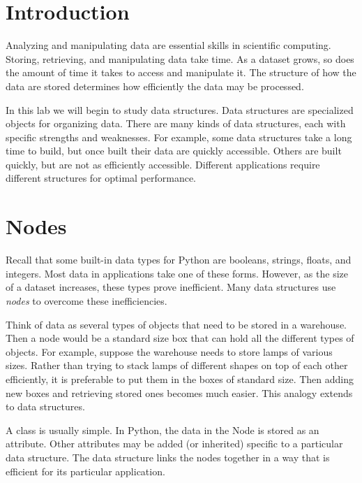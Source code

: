 \label{lab:Python_DataStructures}


\section*{Introduction}

Analyzing and manipulating data are essential skills in scientific computing.
Storing, retrieving, and manipulating data take time.
As a dataset grows, so does the amount of time it takes to access and manipulate it.
The structure of how the data are stored determines how efficiently the data may be processed.

In this lab we will begin to study data structures.
Data structures are specialized objects for organizing data.
There are many kinds of data structures, each with specific strengths and weaknesses.
For example, some data structures take a long time to build, but once built their data are quickly accessible.
Others are built quickly, but are not as efficiently accessible.
Different applications require different structures for optimal performance.

\section*{Nodes}

Recall that some built-in data types for Python are booleans, strings, floats, and integers.
Most data in applications take one of these forms.
However, as the size of a dataset increases, these types prove inefficient.
Many data structures use \emph{nodes} to overcome these inefficiencies.

Think of data as several types of objects that need to be stored in a warehouse.
Then a node would be a standard size box that can hold all the different types of objects.
For example, suppose the warehouse needs to store lamps of various sizes.
Rather than trying to stack lamps of different shapes on top of each other efficiently, it is preferable to put them in the boxes of standard size.
Then adding new boxes and retrieving stored ones becomes much easier.
This analogy extends to data structures.

A  class is usually simple.
In Python, the data in the Node is stored as an attribute.
Other attributes may be added (or inherited) specific to a particular data structure.
The data structure links the nodes together in a way that is efficient for its particular application.


